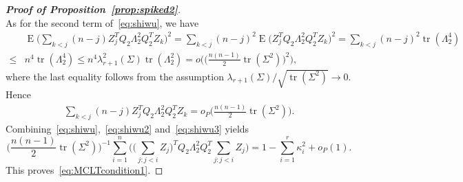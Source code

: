 \documentclass[3p]{elsarticle}
\DeclareMathOperator{\mytr}{tr}
\DeclareMathOperator{\myE}{E}
\theoremstyle{plain}
\theoremstyle{definition}
\theoremstyle{remark}
\begin{document}
\begin{proof}[\textbf{Proof of Proposition~\ref{prop:spiked2}}]
\begin{equation}
     \end{equation}
     As for the second term of~\eqref{eq:shiwu}, we have
     $$
     \begin{aligned}
         &\myE \big(
    \sum_{k<j} (n-j)Z_j^T Q_2 \Lambda_2^2 Q_2^T Z_k 
     \big)^2
     =
    \sum_{k<j} (n-j)^2 \myE \big(Z_j^T Q_2 \Lambda_2^2 Q_2^T Z_k 
     \big)^2
         =
  \sum_{k<j} (n-j)^2 \mytr(\Lambda_2^4)\\
         \leq & n^4\mytr(\Lambda_2^4) 
         \leq  n^4 \lambda_{r+1}^2(\Sigma)\mytr(\Lambda_2^2)
         =
         o\Big(\big(\frac{n(n-1)}{2}\mytr (\Sigma^2)\big)^2\Big)
         ,
     \end{aligned}
     $$
     where the last equality follows from the assumption $\lambda_{r+1}(\Sigma)/\sqrt{\mytr (\Sigma^2)}\to 0$.
     Hence
     \begin{equation}\label{eq:shiwu3}
     \begin{aligned}
    \sum_{k<j} (n-j)Z_j^T Q_2 \Lambda_2^2 Q_2^T Z_k 
         =
         o_P\big(\frac{n(n-1)}{2}\mytr (\Sigma^2)\big)
         .
     \end{aligned}
     \end{equation}
         Combining~\eqref{eq:shiwu},~\eqref{eq:shiwu2} and~\eqref{eq:shiwu3} yields
     $$
         \big(\frac{n(n-1)}{2}\mytr (\Sigma^2)\big)^{-1} \sum_{i=1}^n \Big(\big(\sum_{j:j<i} Z_{j}\big)^T Q_2 \Lambda_2^2 Q_2^T \sum_{j:j<i} Z_{j}\Big)
         = 1-\sum_{i=1}^r \kappa_i^2+o_P(1).
     $$
     This proves~\eqref{eq:MCLTcondition1}.
     

\end{proof}
\end{document}
